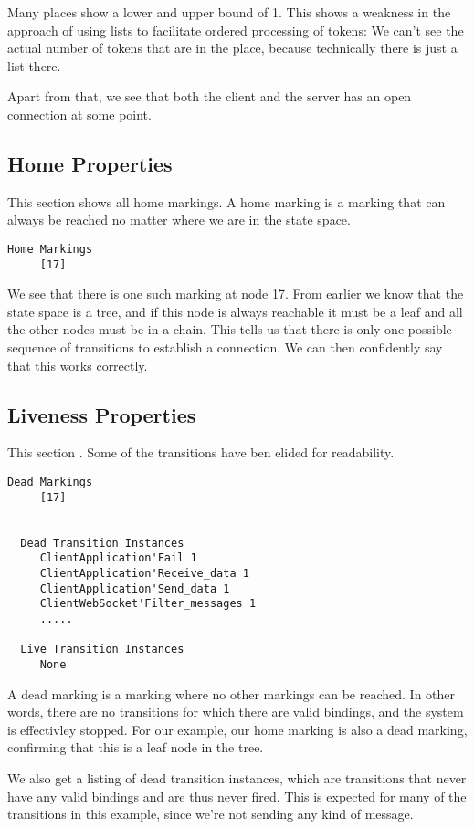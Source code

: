 	Many places show a lower and upper bound of 1. This shows a weakness
	in the approach of using lists to facilitate ordered processing of tokens: We
	can't see the actual number of tokens that are in the place, because
	technically there is just a list there. 
	
	Apart from that, we see that both the client and the server has an open
	connection at some point.
	
	\subsection{Home Properties}
	This section shows all home markings. A home marking is a marking that can
	always be reached no matter where we are in the state space.
	\begin{lstlisting}[language={}]
  Home Markings
     [17]
	\end{lstlisting}
	We see that there
	is one such marking at node 17. From earlier we know that the state space is a
	tree, and if this node is always reachable it must be a leaf and all the other nodes
	must be in a chain. This tells us that there is only one possible sequence of
	transitions to establish a connection. We can then confidently say that this
	works correctly.
	
	\subsection{Liveness Properties}
	This section . Some of the transitions have ben elided for readability.
	\begin{lstlisting}[language={}]
  Dead Markings
     [17]


  Dead Transition Instances
     ClientApplication'Fail 1
     ClientApplication'Receive_data 1
     ClientApplication'Send_data 1
     ClientWebSocket'Filter_messages 1
     .....

  Live Transition Instances
     None
	\end{lstlisting}
	A dead marking is a marking where no other markings can be reached. In other
	words, there are no transitions for which there are valid bindings, and the
	system is effectivley stopped. For our example, our home marking is also a dead
	marking, confirming that this is a leaf node in the tree. 
	
	We also get a listing of dead transition instances, which are transitions that
	never have any valid bindings and are thus never fired. This is expected for
	many of the transitions in this example, since we're not sending any kind of
	message.
	
